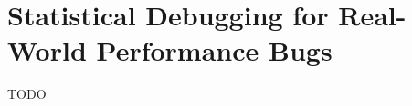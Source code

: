 \chapter[Statistical Debugging for Real-World Performance Bugs]{Statistical Debugging for Real-World Performance Bugs}
\label{chap:sd}

TODO






